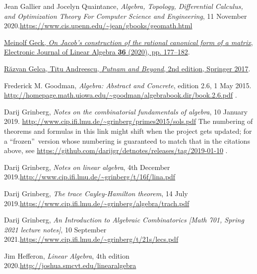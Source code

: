 \documentclass[numbers=enddot,12pt,final,onecolumn,notitlepage]{scrartcl}%
\numberwithin{exer}{subsection}
\theoremstyle{definition}
\begin{document}
\begin{thebibliography}{99999999}
Jean Gallier and Jocelyn Quaintance,
\textit{Algebra, Topology, Differential Calculus, and Optimization Theory For
Computer Science and Engineering}, 11 November 2020.\newline\url{https://www.cis.upenn.edu/~jean/gbooks/geomath.html}

\href{https://doi.org/10.13001/ela.2020.5055}{Meinolf
Geck, \textit{On Jacob's construction of the rational canonical form of a
matrix}, Electronic Journal of Linear Algebra \textbf{36} (2020), pp.
177--182}.

%
\href{https://doi.org/10.1007/978-3-319-58988-6}{R\u{a}zvan Gelca, Titu
Andreescu, \textit{Putnam and Beyond}, 2nd edition, Springer 2017}.

Frederick M. Goodman, \textit{Algebra: Abstract and
Concrete}, edition 2.6, 1 May 2015.\newline%
\url{http://homepage.math.uiowa.edu/~goodman/algebrabook.dir/book.2.6.pdf} .

Darij Grinberg, \textit{Notes on the combinatorial
fundamentals of algebra}, 10 January 2019.\newline%
\url{http://www.cip.ifi.lmu.de/~grinberg/primes2015/sols.pdf} \newline The
numbering of theorems and formulas in this link might shift when the project
gets updated; for a \textquotedblleft frozen\textquotedblright\ version whose
numbering is guaranteed to match that in the citations above, see
\url{https://github.com/darijgr/detnotes/releases/tag/2019-01-10} .

Darij Grinberg, \textit{Notes on linear algebra}, 4th
December 2019.\newline\url{http://www.cip.ifi.lmu.de/~grinberg/t/16f/lina.pdf}

Darij Grinberg, \textit{The trace Cayley-Hamilton
theorem}, 14 July 2019.\newline\url{https://www.cip.ifi.lmu.de/~grinberg/algebra/trach.pdf}

Darij Grinberg, \textit{An Introduction to Algebraic
Combinatorics [Math 701, Spring 2021 lecture notes]}, 10 September
2021.\newline\url{https://www.cip.ifi.lmu.de/~grinberg/t/21s/lecs.pdf}

Jim Hefferon, \textit{Linear Algebra}, 4th edition
2020.\newline\url{http://joshua.smcvt.edu/linearalgebra}


\end{thebibliography}
\end{document}
